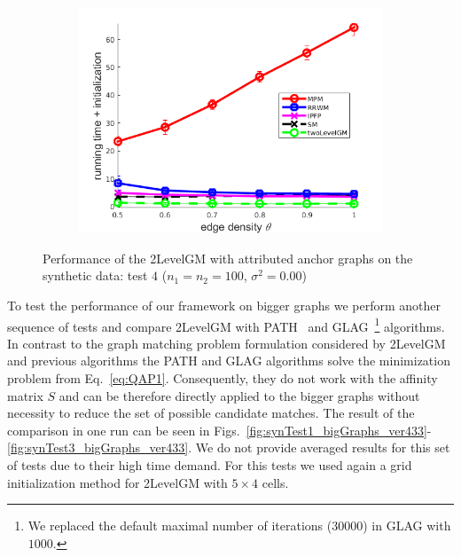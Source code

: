 \begin{figure}[h]
\begin{subfigure}[b]{0.33\textwidth}
			\includegraphics[scale=0.25]{"chapter3/fig/SyntheticTest/descr/Results_v4.3.3/Test4/time_summary_avg10t"} 
		\end{subfigure} 	
	\caption[Performance of the 2LevelGM with attributed anchor graphs on the synthetic data (test $4$)]{Performance of the 2LevelGM with attributed anchor graphs on the synthetic data: test $4$ ($n_1=n_2=100$, $\sigma^2=0.00$)}
	\label{fig:synTest4_descr_ver433}
\end{figure}

To test the performance of our framework on bigger graphs we perform another sequence of tests and compare 2LevelGM with PATH~\cite{Zazlavskiy2008_PATH,code_graphM} and GLAG~\cite{Fiori2013_GLAG,code_GLAG}\footnote{We replaced the default maximal number of iterations ($30000$) in GLAG with $1000$.} algorithms. In contrast to the graph matching problem formulation considered by 2LevelGM and previous algorithms the PATH and GLAG algorithms solve the minimization problem from Eq.~\eqref{eq:QAP1}. Consequently, they do not work with the affinity matrix $S$ and can be therefore directly applied to the bigger graphs without necessity to reduce the set of possible candidate matches. The result of the comparison in one run can be seen in Figs.~\ref{fig:synTest1_bigGraphs_ver433}-\ref{fig:synTest3_bigGraphs_ver433}. We do not provide averaged results for this set of tests due to their high time demand. For this tests we used again a grid initialization method for 2LevelGM with $5\times 4$ cells.
\FloatBarrier

